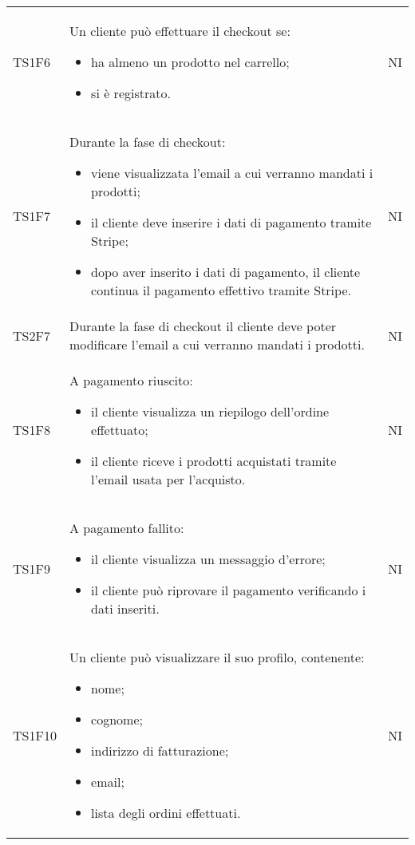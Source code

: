 {\begin{longtable}{C{3cm} C{10.2cm} C{1.5cm}}
TS1F6 & Un cliente può effettuare il checkout se:
\begin{itemize}
	\item ha almeno un prodotto nel carrello;
	\item si è registrato.
\end{itemize}
& NI\\

TS1F7 & Durante la fase di checkout:
\begin{itemize}
	\item viene visualizzata l'email a cui verranno mandati i prodotti;
	\item il cliente deve inserire i dati di pagamento tramite Stripe;
	\item dopo aver inserito i dati di pagamento, il cliente continua il pagamento effettivo tramite Stripe.
\end{itemize}
& NI\\

TS2F7 & Durante la fase di checkout il cliente deve poter modificare l'email a cui verranno mandati i prodotti.
& NI\\

TS1F8 & A pagamento riuscito:
\begin{itemize}
	\item il cliente visualizza un riepilogo dell'ordine effettuato;
	\item il cliente riceve i prodotti acquistati tramite l'email usata per l'acquisto.
\end{itemize}
& NI\\

TS1F9 & A pagamento fallito:
\begin{itemize}
	\item il cliente visualizza un messaggio d'errore;
	\item il cliente può riprovare il pagamento verificando i dati inseriti.
\end{itemize}
& NI\\


TS1F10 & Un cliente può visualizzare il suo profilo, contenente:
\begin{itemize}
	\item nome;
	\item cognome;
	\item indirizzo di fatturazione;
	\item email;
	\item lista degli ordini effettuati.
\end{itemize}
& NI\\


\end{longtable}}
